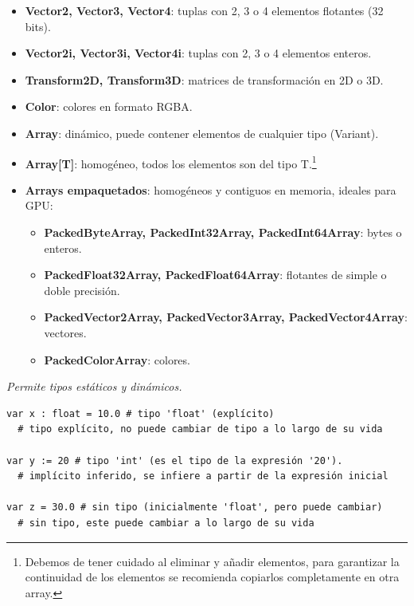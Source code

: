 \documentclass[12pt]{book} %
\begin{document}
\begin{itemize}
\item \textbf{Vector2, Vector3, Vector4}: tuplas con 2, 3 o 4 elementos flotantes (32 bits).
\item \textbf{Vector2i, Vector3i, Vector4i}: tuplas con 2, 3 o 4 elementos enteros.
\item \textbf{Transform2D, Transform3D}: matrices de transformación en 2D o 3D.
\end{itemize}

\begin{itemize}
\item \textbf{Color}: colores en formato RGBA.
\end{itemize}

\begin{itemize}
\item \textbf{Array}: dinámico, puede contener elementos de cualquier tipo (Variant).
\item \textbf{Array[T]}: homogéneo, todos los elementos son del tipo T.\footnote{Debemos de tener cuidado al eliminar y añadir elementos, para garantizar la continuidad de los elementos se recomienda copiarlos completamente en otra array.}
\item \textbf{Arrays empaquetados}: homogéneos y contiguos en memoria, ideales para GPU:
  \begin{itemize}
  \item \textbf{PackedByteArray, PackedInt32Array, PackedInt64Array}: bytes o enteros.
  \item \textbf{PackedFloat32Array, PackedFloat64Array}: flotantes de simple o doble precisión.
  \item \textbf{PackedVector2Array, PackedVector3Array, PackedVector4Array}: vectores.
  \item \textbf{PackedColorArray}: colores.
  \end{itemize}
\end{itemize}

\emph{Permite tipos estáticos y dinámicos.}

\begin{lstlisting}
var x : float = 10.0 # tipo 'float' (explícito) 
  # tipo explícito, no puede cambiar de tipo a lo largo de su vida

var y := 20 # tipo 'int' (es el tipo de la expresión '20').
  # implícito inferido, se infiere a partir de la expresión inicial

var z = 30.0 # sin tipo (inicialmente 'float', pero puede cambiar)
  # sin tipo, este puede cambiar a lo largo de su vida
\end{lstlisting}
\end{document}
